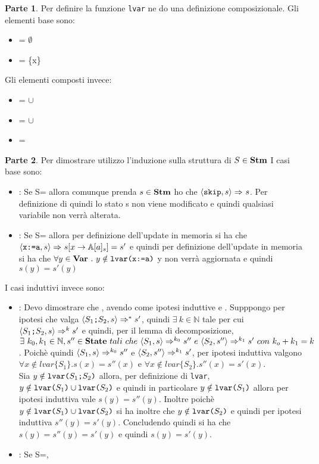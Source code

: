 {
	\hspace*{\textwidth-}\textbf{Parte 1}.
	Per definire la funzione \texttt{lvar} ne do una definizione
	composizionale. Gli elementi base sono:
	\begin{itemize}
	\item \lvar{\skipistr} = $\emptyset$
	\item {} = \{x\}
	\end{itemize}
	Gli elementi composti invece:
	\begin{itemize}
	\item {} =  $\cup$ 
	\item {} =  $\cup$ 
	\item {} = 
	\end{itemize}

	\textbf{Parte 2}. Per dimostrare \exTwo{} utilizzo l'induzione sulla struttura
	di $S\in\mbox{\textbf{Stm}}$
	I casi base sono:
	\begin{itemize}
	\item {}: Se S=\skipistr{} allora comunque prenda 
	$s\in\mbox{\textbf{Stm}}$ ho che $\langle{}\textrm{\normalfont{\texttt{skip}}}, s\rangle{}\Rightarrow^{}s$. Per definizione di 
	\skipistr{} quindi lo stato s non viene modificato e quindi qualsiasi
	variabile non verrà alterata.

	\item {}: Se S= allora per
	definizione dell'update in memoria si ha che 
	$\langle{}\textrm{\normalfont{\texttt{x:=a}}}, s\rangle{}\Rightarrow^{}s[x\rightarrow\mathbb{A}[a]_s]=s'$ e
	quindi per definizione dell'update in memoria si ha che 
	$\forall{}y\in\mbox{\textbf{Var}}~.~y\notin\textrm{\normalfont{\texttt{lvar(\textrm{\normalfont{\texttt{x:=a}}})}}}$ y non verrà aggiornata
	e quindi $s(y)=s'(y)$
	\end{itemize}


	I casi induttivi invece sono:
	\begin{itemize}
	\item {}: Devo dimostrare che 
	, avendo come ipotesi induttive
	 e . Supppongo per ipotesi che valga
	$\langle{}\textrm{\normalfont{\texttt{$S_1$;$S_2$}}}, s\rangle{}\Rightarrow^{*}s'$, quindi 
	$\exists{}~k\in\mathbb{N}$ tale per cui 
	$\langle{}\textrm{\normalfont{\texttt{$S_1$;$S_2$}}}, s\rangle{}\Rightarrow^{k}s'$ e quindi, per il lemma di
	decomposizione, $\exists{}~k_0, k_1\in\mathbb{N},s''\in\mbox{\textbf{State}}~tali~che~
	\langle{}S_1, s\rangle{}\Rightarrow^{k_0}s''~e~\langle{}S_2, s''\rangle{}\Rightarrow^{k_1}s'~con~k_o+k_1=k$.
	Poichè quindi $\langle{}S_1, s\rangle{}\Rightarrow^{k_0}s''$ e 
	$\langle{}S_2, s''\rangle{}\Rightarrow^{k_1}s'$, per ipotesi induttiva valgono
	$\forall{} x \notin lvar\{S_1\}.s(x)=s''(x)$ e 
	$\forall{} x \notin lvar\{S_2\}.s''(x)=s'(x)$. \\
	Sia $y\notin\textrm{\normalfont{\texttt{lvar(\textrm{\normalfont{\texttt{$S_1$;$S_2$}}})}}}$ allora, per definizione di 
	\texttt{lvar}, $y\notin\textrm{\normalfont{\texttt{lvar($S_1$)}}} \cup \textrm{\normalfont{\texttt{lvar($S_2$)}}}$ e quindi in
	particolare $y\notin\textrm{\normalfont{\texttt{lvar($S_1$)}}}$ allora per ipotesi induttiva vale
	$s(y)=s''(y)$. Inoltre poichè $y\notin\textrm{\normalfont{\texttt{lvar($S_1$)}}} \cup \textrm{\normalfont{\texttt{lvar($S_2$)}}}$ si ha
	inoltre che $y\notin\textrm{\normalfont{\texttt{lvar($S_2$)}}}$ e quindi per ipotesi induttiva 
	$s''(y)=s'(y)$. Concludendo quindi si ha che $s(y)=s''(y)=s'(y)$ e quindi
	$s(y)=s'(y)$.

	\item {}: Se 
	S=,
	\end{itemize}
}

\newpage